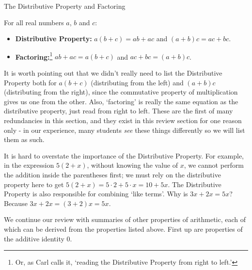 \begin{floatbox}[label=box:distributiveproperty]{The Distributive Property and Factoring}

For all real numbers $a$, $b$ and $c$:

\begin{itemize}

\item  \textbf{Distributive Property:}   $a(b+c) = ab + ac$ and $(a+b)c = ac + bc$.
\item  \textbf{Factoring:}\footnote{Or, as Carl calls it, `reading the Distributive Property from right to left.'}   $ab+ac = a(b+c)$ and $ac + bc = (a+b)c$.

\end{itemize}

\end{floatbox}

It is worth pointing out that we didn't really need to list the Distributive Property both for $a(b+c)$ (distributing from the left) and $(a+b)c$ (distributing from the right), since the commutative property of multiplication gives us one from the other.  Also, `factoring' is really the same equation as the distributive property, just read from right to left. These are the first of many redundancies in this section, and they exist in this review section for one reason only - in our experience, many students \textit{see} these things differently so we will list them as such.   

It is hard to overstate the importance of the Distributive Property.  For example, in the expression $5(2+x)$, without knowing the value of $x$, we cannot perform the addition inside the parentheses first;  we must rely on the distributive property here to get  $5(2+x) = 5\cdot 2 + 5 \cdot x = 10 + 5x$.  The Distributive Property is also responsible for combining `like terms'.  Why is $3x + 2x = 5x$?  Because  $3x + 2x = (3+2)x = 5x$.  

We continue our review with summaries of other properties of arithmetic, each of which can be derived from the properties listed above.  First up are properties of the additive identity $0$.


